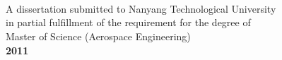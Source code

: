 \begin{titlepage}
  \begin{center}
    \vspace*{2cm}
     \\
    \vspace*{3cm}
     \\
    \vspace*{7cm}
     \\
    \vspace*{0.5cm}
    \noindent A dissertation submitted to Nanyang Technological University \\
    \noindent in partial fulfillment of the requirement for the degree of \\
    \noindent Master of Science (Aerospace Engineering) \\
    \vspace*{0.5cm}
    \noindent \textbf{2011}
  \end{center}
\end{titlepage}
